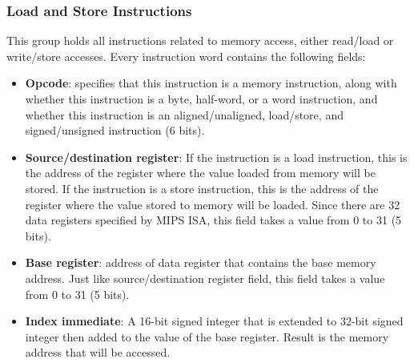 \documentclass[]{scrartcl}
\begin{document}
\subsubsection{Load and Store Instructions}

This group holds all instructions related to memory access, either
read/load or write/store accesses. Every instruction word contains
the following fields:

\begin{itemize}

\item \textbf{Opcode}: specifies that this instruction is a memory
                       instruction, along with whether this instruction
                       is a byte, half-word, or a word instruction, and
                       whether this instruction is an aligned/unaligned,
                       load/store, and signed/unsigned instruction
                       (6 bits).

\item \textbf{Source/destination register}: If the instruction is a load
                                            instruction, this is the address
                                            of the register where the value
                                            loaded from memory will be stored.
                                            If the instruction is a store
                                            instruction, this is the address
                                            of the register where the value
                                            stored to memory will be loaded.
                                            Since there are 32 data registers
                                            specified by MIPS ISA, this field
                                            takes a value from 0 to 31
                                            (5 bits).

\item \textbf{Base register}: address of data register that contains
                              the base memory address. Just like
                              source/destination register field, this
                              field takes a value from 0 to 31 (5 bits).

\item \textbf{Index immediate}: A 16-bit signed integer that is extended to
                                32-bit signed integer then added to the value
                                of the base register. Result is the memory
                                address that will be accessed.

\end{itemize}
\end{document}
